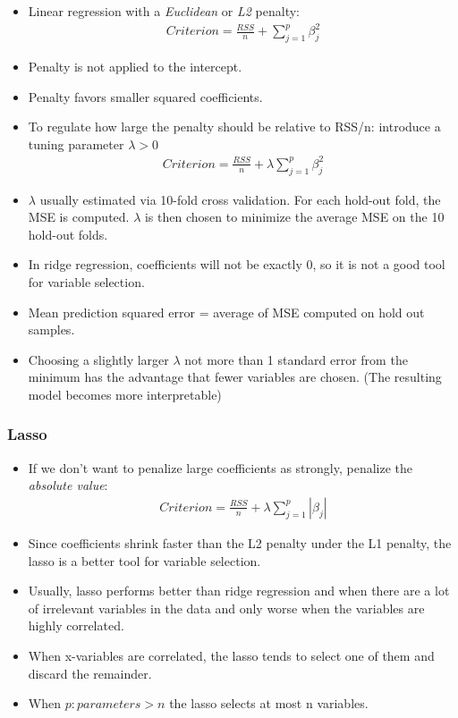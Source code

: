 \documentclass[12pt, oneside]{article}
\begin{document}
\begin{itemize}
    \item Linear regression with a \emph{Euclidean} or \emph{L2} penalty:
    \begin{align*}
    Criterion = \frac{RSS}{n} + \sum^p_{j=1}\beta^2_j
    \end{align*}
    \item Penalty is not applied to the intercept.
    \item Penalty favors smaller squared coefficients.
    \item To regulate how large the penalty should be relative to RSS/n: introduce a tuning parameter $\lambda > 0$
    \begin{align*}
    Criterion = \frac{RSS}{n} + \lambda\sum^p_{j=1}\beta^2_j
    \end{align*}
    \item $\lambda$ usually estimated via 10-fold cross validation. For each hold-out fold, the MSE is computed. $\lambda$ is then chosen to minimize the average MSE on the 10 hold-out folds. 
    \item In ridge regression, coefficients will not be exactly 0, so it is not a good tool for variable selection.
    \item Mean prediction squared error = average of MSE computed on hold out samples. 
    \item Choosing a slightly larger $\lambda$ not more than 1 standard error from the minimum has the advantage that fewer variables are chosen. (The resulting model becomes more interpretable)
\end{itemize}

\subsubsection{Lasso}
\begin{itemize}
    \item If we don't want to penalize large coefficients as strongly, penalize the \emph{absolute value}:
    \begin{align*}
        Criterion = \frac{RSS}{n} + \lambda\sum^p_{j=1}|\beta_j|
    \end{align*}
    \item Since coefficients shrink faster than the L2 penalty under the L1 penalty, the lasso is a better tool for variable selection. 
    \item Usually, lasso performs better than ridge regression and when there are a lot of irrelevant variables in the data and only worse when the variables are highly correlated.
    \item When x-variables are correlated, the lasso tends to select one of them and discard the remainder. 
    \item When $p:parameters > n$ the lasso selects at most n variables.
\end{itemize}
\end{document}
